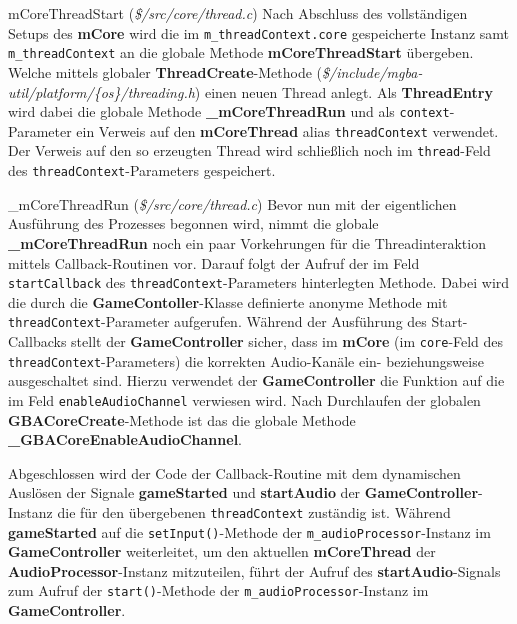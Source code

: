 \documentclass[11pt,a4paper]{scrartcl}
\begin{document}
\vspace{5mm}
\large mCoreThreadStart \normalsize(\textit{\$/src/core/thread.c})
\vspace{2mm}\newline
Nach Abschluss des vollst\"andigen Setups des \textbf{mCore} wird die im \verb|m_threadContext.core| gespeicherte Instanz samt \verb|m_threadContext| an die globale Methode \textbf{mCoreThreadStart} \"ubergeben. Welche mittels globaler \textbf{ThreadCreate}-Methode (\textit{\$/include/mgba-util/platform/\{os\}/threading.h}) einen neuen Thread anlegt. Als \textbf{ThreadEntry} wird dabei die globale Methode \textbf{{\_}mCoreThreadRun} und als \verb|context|-Parameter ein Verweis auf den \textbf{mCoreThread} alias \verb|threadContext| verwendet. Der Verweis auf den so erzeugten Thread wird schlie{\ss}lich noch im \verb|thread|-Feld des \verb|threadContext|-Parameters gespeichert.

\vspace{5mm}
\large {\_}mCoreThreadRun \normalsize(\textit{\$/src/core/thread.c})
\vspace{2mm}\newline
Bevor nun mit der eigentlichen Ausf\"uhrung des Prozesses begonnen wird, nimmt die globale \textbf{{\_}mCoreThreadRun} noch ein paar Vorkehrungen f\"ur die Threadinteraktion mittels Callback-Routinen vor. Darauf folgt der Aufruf der im Feld \verb|startCallback| des \verb|threadContext|-Parameters hinterlegten Methode. Dabei wird die durch die \textbf{GameContoller}-Klasse definierte anonyme Methode mit \verb|threadContext|-Parameter aufgerufen. W\"ahrend der Ausf\"uhrung des Start-Callbacks stellt der \textbf{GameController} sicher, dass im \textbf{mCore} (im \verb|core|-Feld des \verb|threadContext|-Parameters) die korrekten Audio-Kan\"ale ein- beziehungsweise ausgeschaltet sind. Hierzu verwendet der \textbf{GameController} die Funktion auf die im Feld \verb|enableAudioChannel| verwiesen wird. Nach Durchlaufen der globalen \textbf{GBACoreCreate}-Methode ist das die globale Methode \textbf{{\_}GBACoreEnableAudioChannel}.

Abgeschlossen wird der Code der Callback-Routine mit dem dynamischen Ausl\"osen der Signale \textbf{gameStarted} und \textbf{startAudio} der \textbf{GameController}-Instanz die f\"ur den \"ubergebenen \verb|threadContext| zust\"andig ist. W\"ahrend \textbf{gameStarted} auf die \verb|setInput()|-Methode der \verb|m_audioProcessor|-Instanz im \textbf{GameController} weiterleitet, um den aktuellen \textbf{mCoreThread} der \textbf{AudioProcessor}-Instanz mitzuteilen, f\"uhrt der Aufruf des \textbf{startAudio}-Signals zum Aufruf der \verb|start()|-Methode der \verb|m_audioProcessor|-Instanz im \textbf{GameController}.
\end{document}
